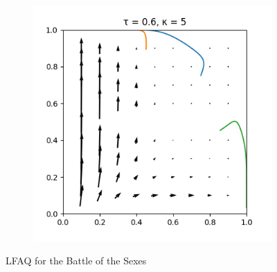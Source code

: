 \documentclass[10pt,a4paper]{article}
\begin{document}
\begin{figure}[h]
\begin{subfigure}[b]{0.30\textwidth}
    \end{subfigure}
    \begin{subfigure}[b]{0.30\textwidth}
        \includegraphics[width=\textwidth]{Figures/boltzmann_bots_5.png}
    \end{subfigure}
    \caption{LFAQ for the Battle of the Sexes}
    \label{fig:boltz_bots}
\end{figure}
\end{document}
